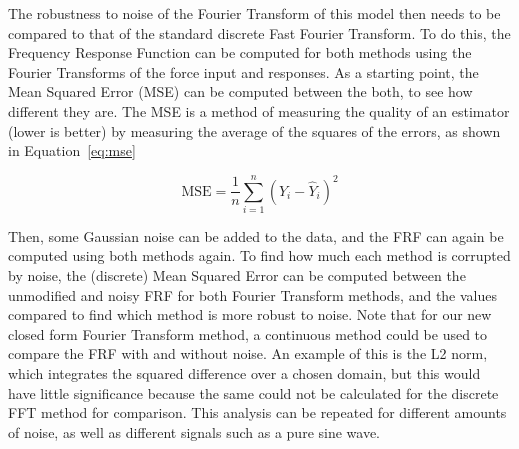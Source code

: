 \documentclass[12pt]{article}
\begin{document}
    The robustness to noise of the Fourier Transform of this model then needs to be compared to that of the standard discrete Fast Fourier Transform.
    To do this, the Frequency Response Function can be computed for both methods using the Fourier Transforms of the force input and responses.
    As a starting point, the Mean Squared Error (MSE) can be computed between the both, to see how different they are.
    The MSE is a method of measuring the quality of an estimator (lower is better) by measuring the average of the squares of the errors, as shown in Equation~\ref{eq:mse}

    \begin{equation}
        \text{MSE} = \frac{1}{n} \sum_{i=1}^{n} (Y_i - \hat{Y}_i)^2\label{eq:mse}
    \end{equation}


    Then, some Gaussian noise can be added to the data, and the FRF can again be computed using both methods again.
    To find how much each method is corrupted by noise, the (discrete) Mean Squared Error can be computed between the unmodified and noisy FRF for both Fourier Transform methods, and the values compared to find which method is more robust to noise.
    Note that for our new closed form Fourier Transform method, a continuous method could be used to compare the FRF with and without noise.
    An example of this is the L2 norm, which integrates the squared difference over a chosen domain, but this would have little significance because the same could not be calculated for the discrete FFT method for comparison.
    This analysis can be repeated for different amounts of noise, as well as different signals such as a pure sine wave.
\end{document}

